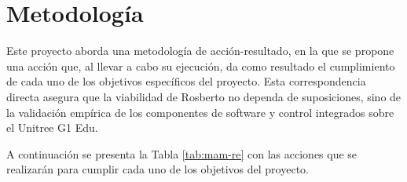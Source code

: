 \documentclass[stu,12pt,floatsintext]{apa7}
\begin{document}









\section{Metodología}

Este proyecto aborda una metodología de acción-resultado, en la que se propone una acción que, al llevar a cabo su ejecución, da como resultado el cumplimiento de cada uno de los objetivos específicos del proyecto. Esta correspondencia directa asegura que la viabilidad de Rosberto no dependa de suposiciones, sino de la validación empírica de los componentes de software y control integrados sobre el Unitree G1 Edu.

A continuación se presenta la Tabla \ref{tab:mam-re} con las acciones que se realizarán para cumplir cada uno de los objetivos del proyecto.
\end{document}
